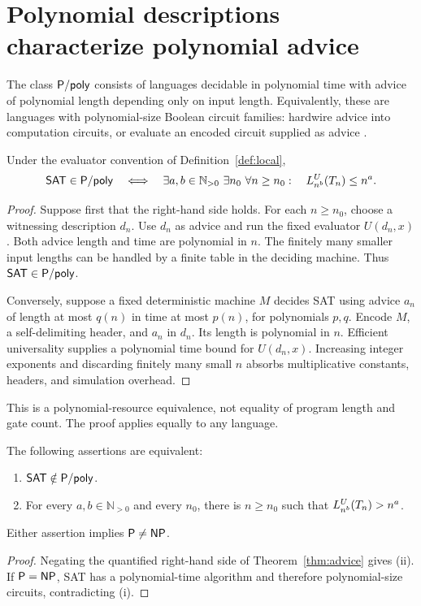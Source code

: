 \section{Polynomial descriptions characterize polynomial advice}
The class \(\mathsf{P}/\mathsf{poly}\) consists of languages decidable in polynomial time
with advice of polynomial length depending only on input length.
Equivalently, these are languages with polynomial-size Boolean circuit
families: hardwire advice into computation circuits, or evaluate an
encoded circuit supplied as advice \cite{AroraBarak2009}.

\begin{theorem}
\label{thm:advice}
Under the evaluator convention of Definition~\ref{def:local},
\[
 \mathsf{SAT}\in\mathsf{P}/\mathsf{poly}
 \quad\Longleftrightarrow\quad
 \exists a,b\in\mathbb N_{>0}\ \exists n_0\
 \forall n\geq n_0:\quad L^{U}_{n^b}(T_n)\leq n^a.
\]
\end{theorem}
\begin{proof}
Suppose first that the right-hand side holds. For each \(n\geq n_0\),
choose a witnessing description \(d_n\). Use \(d_n\) as advice and run
the fixed evaluator \(U(d_n,x)\). Both advice length and time are
polynomial in \(n\). The finitely many smaller input lengths can be
handled by a finite table in the deciding machine. Thus
\(\mathsf{SAT}\in\mathsf{P}/\mathsf{poly}\).

Conversely, suppose a fixed deterministic machine \(M\) decides
SAT using advice \(a_n\) of length at most \(q(n)\) in time at most
\(p(n)\), for polynomials \(p,q\). Encode \(M\), a self-delimiting
header, and \(a_n\) in \(d_n\). Its length is polynomial in \(n\).
Efficient universality supplies a polynomial time bound for
\(U(d_n,x)\). Increasing integer exponents and discarding finitely
many small \(n\) absorbs multiplicative constants, headers, and
simulation overhead.
\end{proof}

This is a polynomial-resource equivalence, not equality of program
length and gate count. The proof applies equally to any language.

\begin{corollary}
\label{cor:target}
The following assertions are equivalent:
\begin{enumerate}[label=(\roman*)]
 \item \(\mathsf{SAT}\notin\mathsf{P}/\mathsf{poly}\).
 \item For every \(a,b\in\mathbb N_{>0}\) and every \(n_0\), there is
 \(n\geq n_0\) such that \(L^{U}_{n^b}(T_n)>n^a\).
\end{enumerate}
Either assertion implies \(\mathsf{P}\ne\mathsf{NP}\).
\end{corollary}
\begin{proof}
Negating the quantified right-hand side of Theorem~\ref{thm:advice}
gives (ii). If \(\mathsf{P}=\mathsf{NP}\), SAT has a polynomial-time algorithm and
therefore polynomial-size circuits, contradicting (i).
\end{proof}

